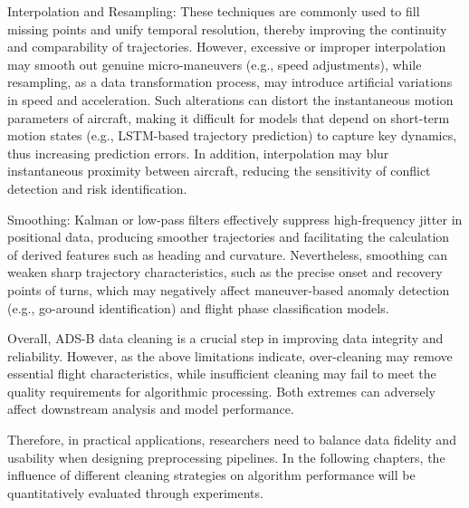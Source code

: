 Interpolation and Resampling: These techniques are commonly used to fill missing points and unify temporal resolution, thereby improving the continuity and comparability of trajectories. However, excessive or improper interpolation may smooth out genuine micro-maneuvers (e.g., speed adjustments), while resampling, as a data transformation process, may introduce artificial variations in speed and acceleration. Such alterations can distort the instantaneous motion parameters of aircraft, making it difficult for models that depend on short-term motion states (e.g., LSTM-based trajectory prediction) to capture key dynamics, thus increasing prediction errors. In addition, interpolation may blur instantaneous proximity between aircraft, reducing the sensitivity of conflict detection and risk identification.

Smoothing: Kalman or low-pass filters effectively suppress high-frequency jitter in positional data, producing smoother trajectories and facilitating the calculation of derived features such as heading and curvature. Nevertheless, smoothing can weaken sharp trajectory characteristics, such as the precise onset and recovery points of turns, which may negatively affect maneuver-based anomaly detection (e.g., go-around identification) and flight phase classification models.

Overall, ADS-B data cleaning is a crucial step in improving data integrity and reliability. However, as the above limitations indicate, over-cleaning may remove essential flight characteristics, while insufficient cleaning may fail to meet the quality requirements for algorithmic processing. Both extremes can adversely affect downstream analysis and model performance.

Therefore, in practical applications, researchers need to balance data fidelity and usability when designing preprocessing pipelines. In the following chapters, the influence of different cleaning strategies on algorithm performance will be quantitatively evaluated through experiments.
